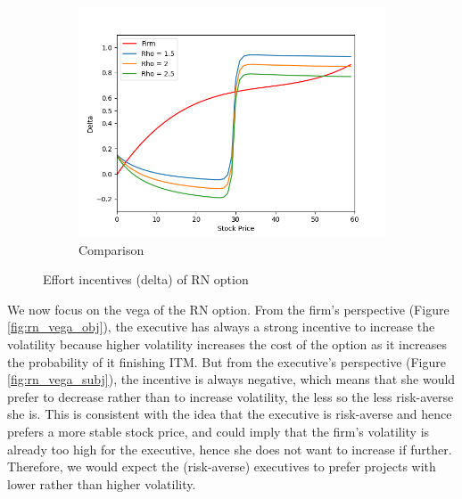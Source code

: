 \begin{figure}[H]
\begin{subfigure}{0.32\textwidth}
        \centering
        \includegraphics[width=\textwidth]{fig/4/delta_comp.png}
        \caption{Comparison}
        \label{fig:rn_delta_comp}
    \end{subfigure}
    \caption{Effort incentives (delta) of RN option}
    \label{fig:rn_delta_both}
\end{figure}
\vspace*{15pt}

We now focus on the vega of the RN option. From the firm's perspective (Figure \ref*{fig:rn_vega_obj}), the executive has always a strong incentive to increase the volatility because higher volatility increases the cost of the option as it increases the probability of it finishing ITM. But from the executive's perspective (Figure \ref*{fig:rn_vega_subj}), the incentive is always negative, which means that she would prefer to decrease rather than to increase volatility, the less so the less risk-averse she is. This is consistent with the idea that the executive is risk-averse and hence prefers a more stable stock price, and could imply that the firm's volatility is already too high for the executive, hence she does not want to increase if further. Therefore, we would expect the (risk-averse) executives to prefer projects with lower rather than higher volatility.

